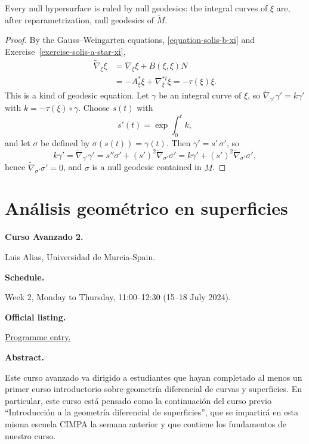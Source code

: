 \begin{exercise}
\label{exercise-solis-ruled}
Every null hypersurface is ruled by null
geodesics: the integral curves of $\xi$
are, after reparametrization, null
geodesics of $\widetilde{M}$.
\end{exercise}

\begin{proof}
By the Gauss--Weingarten equations,
\eqref{equation-solis-b-xi} and
Exercise~\ref{exercise-solis-a-star-xi},
$$
\begin{aligned}
\widetilde{\nabla}_{\xi}\xi
&=\nabla_{\xi}\xi+B(\xi,\xi)N\\
&=-A^*_{\xi}\xi+\nabla^{*t}_{\xi}\xi
=-\tau(\xi)\xi.
\end{aligned}
$$
This is a kind of geodesic equation. Let
$\gamma$ be an integral curve of $\xi$,
so $\widetilde{\nabla}_{\gamma'}\gamma'
=k\gamma'$ with $k=-\tau(\xi)\circ\gamma$.
Choose $s(t)$ with
$$
s'(t)=\exp\int_0^tk,
$$
and let $\sigma$ be defined by
$\sigma(s(t))=\gamma(t)$. Then
$\gamma'=s'\,\sigma'$, so
$$
k\gamma'
=\widetilde{\nabla}_{\gamma'}\gamma'
=s''\sigma'+(s')^2
\widetilde{\nabla}_{\sigma'}\sigma'
=k\gamma'+(s')^2
\widetilde{\nabla}_{\sigma'}\sigma',
$$
hence $\widetilde{\nabla}_{\sigma'}
\sigma'=0$, and $\sigma$ is a null
geodesic contained in $M$.
\end{proof}

\section{Análisis geométrico en superficies}
\label{section-alias-geometric-analysis}

\medskip\noindent
{\bf Curso Avanzado 2.}

Luis Alias,
Universidad de Murcia-Spain.

\medskip\noindent
{\bf Schedule.}

Week 2, Monday to Thursday, 11:00--12:30
(15--18 July 2024).

\medskip\noindent
{\bf Official listing.}

\href{%
https://naturales.ues.edu.sv/%
ecimpasv2024/advanced-curse-2/}{%
Programme entry.}

\medskip\noindent
{\bf Abstract.}

Este curso avanzado va dirigido a estudiantes
que hayan completado al menos un primer curso
introductorio sobre geometría diferencial de
curvas y superficies. En particular, este
curso está pensado como la continuación del
curso previo ``Introducción a la geometría
diferencial de superficies'', que se
impartirá en esta misma escuela CIMPA la
semana anterior y que contiene los
fundamentos de nuestro curso.


